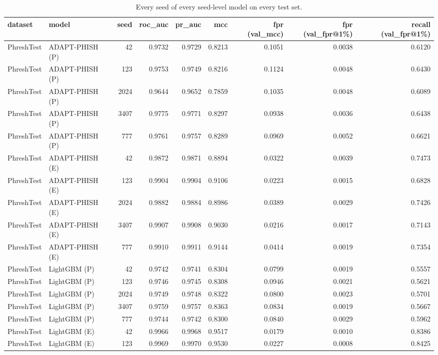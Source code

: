 \begin{table}[t]
\centering
\scriptsize
\caption{Every seed of every seed-level model on every test set.}
\label{tab:rev_R11_every_seed}
\begin{tabular}{llrrrrrrr}
\toprule
dataset & model & seed & roc\_auc & pr\_auc & mcc & fpr (val\_mcc) & fpr (val\_fpr@1\%) & recall (val\_fpr@1\%) \\
\midrule
PhreshTest & ADAPT-PHISH (P) & 42 & 0.9732 & 0.9729 & 0.8213 & 0.1051 & 0.0038 & 0.6120 \\
PhreshTest & ADAPT-PHISH (P) & 123 & 0.9753 & 0.9749 & 0.8216 & 0.1124 & 0.0048 & 0.6430 \\
PhreshTest & ADAPT-PHISH (P) & 2024 & 0.9644 & 0.9652 & 0.7859 & 0.1035 & 0.0048 & 0.6089 \\
PhreshTest & ADAPT-PHISH (P) & 3407 & 0.9775 & 0.9771 & 0.8297 & 0.0938 & 0.0036 & 0.6438 \\
PhreshTest & ADAPT-PHISH (P) & 777 & 0.9761 & 0.9757 & 0.8289 & 0.0969 & 0.0052 & 0.6621 \\
PhreshTest & ADAPT-PHISH (E) & 42 & 0.9872 & 0.9871 & 0.8894 & 0.0322 & 0.0039 & 0.7473 \\
PhreshTest & ADAPT-PHISH (E) & 123 & 0.9904 & 0.9904 & 0.9106 & 0.0223 & 0.0015 & 0.6828 \\
PhreshTest & ADAPT-PHISH (E) & 2024 & 0.9882 & 0.9884 & 0.8986 & 0.0389 & 0.0029 & 0.7426 \\
PhreshTest & ADAPT-PHISH (E) & 3407 & 0.9907 & 0.9908 & 0.9030 & 0.0216 & 0.0017 & 0.7143 \\
PhreshTest & ADAPT-PHISH (E) & 777 & 0.9910 & 0.9911 & 0.9144 & 0.0414 & 0.0019 & 0.7354 \\
PhreshTest & LightGBM (P) & 42 & 0.9742 & 0.9741 & 0.8304 & 0.0799 & 0.0019 & 0.5557 \\
PhreshTest & LightGBM (P) & 123 & 0.9746 & 0.9745 & 0.8308 & 0.0946 & 0.0021 & 0.5621 \\
PhreshTest & LightGBM (P) & 2024 & 0.9749 & 0.9748 & 0.8322 & 0.0800 & 0.0023 & 0.5701 \\
PhreshTest & LightGBM (P) & 3407 & 0.9759 & 0.9757 & 0.8363 & 0.0834 & 0.0019 & 0.5667 \\
PhreshTest & LightGBM (P) & 777 & 0.9744 & 0.9742 & 0.8300 & 0.0840 & 0.0029 & 0.5962 \\
PhreshTest & LightGBM (E) & 42 & 0.9966 & 0.9968 & 0.9517 & 0.0179 & 0.0010 & 0.8386 \\
PhreshTest & LightGBM (E) & 123 & 0.9969 & 0.9970 & 0.9530 & 0.0227 & 0.0008 & 0.8425 \\

\end{tabular}
\end{table}
